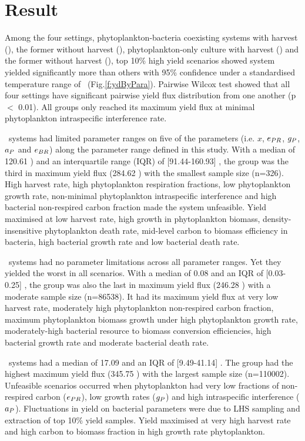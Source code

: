 \documentclass[../thesis.tex]{subfiles} %
\begin{document}
\section{Result}
Among the four settings, phytoplankton-bacteria coexisting systems with harvest (\PBH), the former without harvest (\PBN), phytoplankton-only culture with harvest (\PoH) and the former without harvest (\PoN), top 10\% high yield scenarios showed \PBH system yielded significantly more than others with 95\% confidence under a standardised temperature range of \temp\ (Fig.\ref{f:ydByPara}).  Pairwise Wilcox test showed that all four settings have significant pairwise yield flux distribution from one another (p $<$ 0.01).  All groups only reached its maximum yield flux at minimal phytoplankton intraspecific interference rate.

\PBH\ systems had limited parameter ranges on five of the parameters (i.e. $x$, $e_{PR}$, $g_P$, $a_P$ and $e_{BR}$) along the parameter range defined in this study.  With a median of 120.61 \dxdt) and an interquartile range (IQR) of [91.44-160.93] \dxdt, the group was the third in maximum yield flux (284.62 \dxdt) with the smallest sample size (n=326).  High harvest rate, high phytoplankton respiration fractions, low phytoplankton growth rate, non-minimal phytoplankton intraspecific interference and high bacterial non-respired carbon fraction made the system unfeasible.  Yield maximised at low harvest rate, high growth in phytoplankton biomass, density-insensitive phytoplankton death rate, mid-level carbon to biomass efficiency in bacteria, high bacterial growth rate and low bacterial death rate.

\PBN\ systems had no parameter limitations across all parameter ranges.  Yet they yielded the worst in all scenarios.  With a median of 0.08 \dxdt and an IQR of [0.03-0.25] \dxdt, the group was also the last in maximum yield flux (246.28 \dxdt) with a moderate sample size (n=86538).  It had its maximum yield flux at very low harvest rate, moderately high phytoplankton non-respired carbon fraction, maximum phytoplankton biomass growth under high phytoplankton growth rate, moderately-high bacterial resource to biomass conversion efficiencies, high bacterial growth rate and moderate bacterial death rate.  

\PoH\ systems had a median of 17.09 \dxdt and an IQR of [9.49-41.14] \dxdt.  The group had the highest maximum yield flux (345.75 \dxdt) with the largest sample size (n=110002).  Unfeasible scenarios occurred when phytoplankton had very low fractions of non-respired carbon ($e_{PR}$), low growth rates ($g_P$) and high intraspecific interference ($a_P$).  Fluctuations in yield on bacterial parameters were due to LHS sampling and extraction of top 10\% yield samples.  Yield maximised at very high harvest rate and high carbon to biomass fraction in high growth rate phytoplankton.
\end{document}
